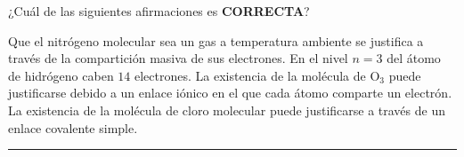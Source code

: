 \documentclass[a4paper,addpoints,14pt]{exam}
\newcommand*\chem[1]{\ensuremath{\mathrm{#1}}}
\newcommand{\halmos}{\vspace*{-4mm}
	
					\begin{flushright}
						\rule{1mm}{2.5mm} 
					\end{flushright}\vspace*{-4mm}
						
					  }
\renewcommand{\qed}{\halmos}
\begin{document}
\begin{questions}
	
	\begin{question}[1] ¿Cuál de las siguientes afirmaciones es \textbf{\small{CORRECTA}}?
		\begin{checkboxes}
			\choice Que el nitrógeno molecular sea un gas a temperatura ambiente se justifica a través de la 									compartición masiva de sus electrones.			
			\choice En el nivel $n=3$ del átomo de hidrógeno caben $14$ electrones.	
			\choice La existencia de la molécula de $\chem{O_3}$ puede justificarse debido a un enlace iónico en el que 						cada átomo comparte un electrón.
			\CorrectChoice La existencia de la molécula de cloro molecular puede justificarse a través de un enlace covalente simple.
		\end{checkboxes}	
	\end{question}
	\qed
\vspace{-1ex}
	


%
%
%
	



\end{questions}
\end{document}
